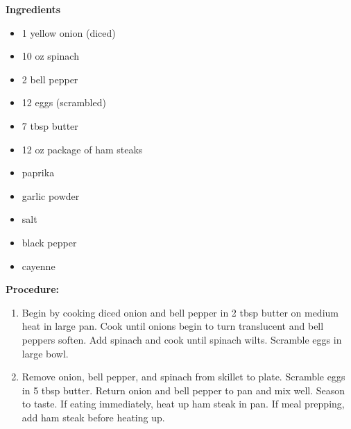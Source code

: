 \begin{multicols}{2}
\textbf{Ingredients}
\begin{itemize}
\item 1 yellow onion (diced)
\item 10 oz spinach
\item 2 bell pepper
\item 12 eggs (scrambled)
\item 7 tbsp butter
\item 12 oz package of ham steaks
\item paprika 
\item garlic powder 
\item salt
\item black pepper
\item cayenne



\end{itemize}


\columnbreak
\textbf{Procedure:}


\begin{enumerate}
\item Begin by cooking diced onion and bell pepper in 2 tbsp butter on medium heat in large pan. Cook until onions begin to turn translucent and bell peppers soften. Add spinach and cook until spinach wilts. Scramble eggs in large bowl. 


\item Remove onion, bell pepper, and spinach from skillet to plate. Scramble eggs in 5 tbsp butter. Return onion and bell pepper to pan and mix well. Season to taste. If eating immediately, heat up ham steak in pan. If meal prepping, add ham steak before heating up. 

 
\end{enumerate}
\end{multicols}



